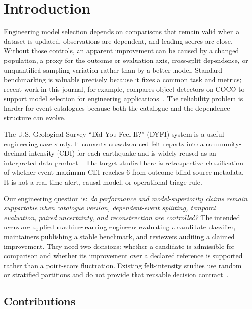 \documentclass[pdflatex,sn-basic,Numbered]{sn-jnl}
\begin{document}
\section{Introduction}\label{sec:intro}

Engineering model selection depends on comparisons that remain valid when a
dataset is updated, observations are dependent, and leading scores are close.
Without those controls, an apparent improvement can be caused by a changed
population, a proxy for the outcome or evaluation axis, cross-split dependence,
or unquantified sampling variation rather than by a better model. Standard
benchmarking is valuable precisely because it fixes a common task and metrics;
recent work in this journal, for example, compares object detectors on COCO to
support model selection for engineering applications~\citep{tian2024coco}.
The reliability problem is harder for event catalogues because both the
catalogue and the dependence structure can evolve.

The U.S. Geological Survey ``Did You Feel It?'' (DYFI) system is a useful
engineering case study. It converts crowdsourced felt reports into a
community-decimal intensity (CDI) for each earthquake and is widely reused as
an interpreted data product~\citep{wald1999dyfi,atkinson2007dyfi,wald2012dyfi,
quitoriano2020dyfi}. The target studied here is retrospective classification of
whether event-maximum CDI reaches 6 from outcome-blind source metadata. It is
not a real-time alert, causal model, or operational triage rule.

Our engineering question is: \emph{do performance and model-superiority claims
remain supportable when catalogue version, dependent-event splitting, temporal
evaluation, paired uncertainty, and reconstruction are controlled?} The
intended users are applied machine-learning engineers evaluating a candidate
classifier, maintainers publishing a stable benchmark, and reviewers auditing a
claimed improvement. They need two decisions: whether a candidate is admissible
for comparison and whether its improvement over a declared reference is
supported rather than a point-score fluctuation. Existing felt-intensity studies
use random or stratified partitions and do not provide that reusable decision
contract~\citep{patelli2026macroseismic,mori2025explainable}.

\subsection{Contributions}\label{sec:contrib}
\end{document}
